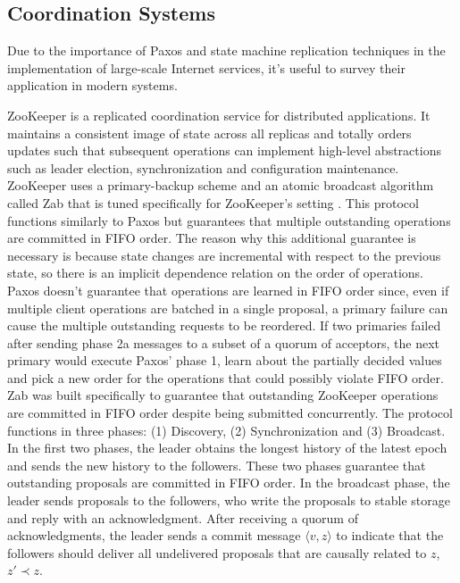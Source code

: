 \documentclass[runningheads,a4paper]{llncs}
\begin{document}
\subsection{Coordination Systems} \label{Coordination Systems}
Due to the importance of Paxos and state machine replication techniques in the implementation of large-scale Internet services, it's useful to survey their application in modern systems.\par
ZooKeeper is a replicated coordination service for distributed applications. It maintains a consistent image of state across all replicas and totally orders updates such that subsequent operations can implement high-level abstractions such as leader election, synchronization and configuration maintenance. ZooKeeper uses a primary-backup scheme and an atomic broadcast algorithm called Zab that is tuned specifically for ZooKeeper's setting \cite{Junqueira2011}. This protocol functions similarly to Paxos but guarantees that multiple outstanding operations are committed in FIFO order. The reason why this additional guarantee is necessary is because state changes are incremental with respect to the previous state, so there is an implicit dependence relation on the order of operations. Paxos doesn't guarantee that operations are learned in 	FIFO order since, even if multiple client operations are batched in a single proposal, a primary failure can cause the multiple outstanding requests to be reordered. If two primaries failed after sending phase 2a messages to a subset of a quorum of acceptors, the next primary would execute Paxos' phase 1, learn about the partially decided values and pick a new order for the operations that could possibly violate FIFO order. Zab was built specifically to guarantee that outstanding ZooKeeper operations are committed in FIFO order despite being submitted concurrently. The protocol functions in three phases: (1) Discovery, (2) Synchronization and (3) Broadcast. In the  first two phases, the leader obtains the longest history of the latest epoch and sends the new history to the followers. These two phases guarantee that outstanding proposals are committed in FIFO order. In the broadcast phase, the leader sends proposals to the followers, who write the proposals to stable storage and reply with an acknowledgment. After receiving a quorum of acknowledgments, the leader sends a commit message $\langle v,z \rangle$ to indicate that the followers should deliver all undelivered proposals that are causally related to $z$, $z' \prec z$. \par
\end{document}
